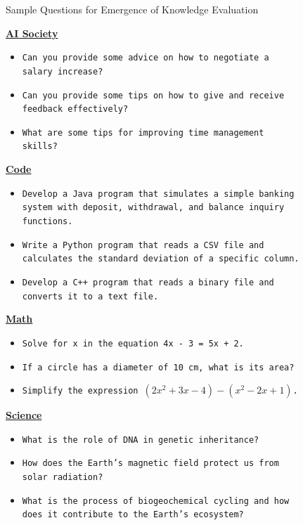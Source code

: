 \begin{figure}[h]
	\begin{AIBox}{Sample Questions for Emergence of Knowledge Evaluation}
		\parbox[t]{\textwidth}{{\bf \underline{AI Society}}}

		\begin{itemize}
			\item \texttt{Can you provide some advice on how to negotiate a salary increase?}
			\item \texttt{Can you provide some tips on how to give and receive feedback effectively?}
			\item \texttt{What are some tips for improving time management skills?}
		\end{itemize}

		\parbox[t]{\textwidth}{{\bf \underline{Code}}}

		\begin{itemize}
			\item \texttt{Develop a Java program that simulates a simple banking system with deposit, withdrawal, and balance inquiry functions.}
			\item \texttt{Write a Python program that reads a CSV file and calculates the standard deviation of a specific column.}
			\item \texttt{Develop a C++ program that reads a binary file and converts it to a text file.}
		\end{itemize}


		\parbox[t]{\textwidth}{{\bf \underline{Math}}}

		\begin{itemize}
			\item \texttt{Solve for x in the equation 4x - 3 = 5x + 2.}
			\item \texttt{If a circle has a diameter of 10 cm, what is its area?}
			\item \texttt{Simplify the expression $(2x^2 + 3x - 4) - (x^2 - 2x + 1)$.}
		\end{itemize}


		\parbox[t]{\textwidth}{{\bf \underline{Science}}}

		\begin{itemize}
			\item \texttt{What is the role of DNA in genetic inheritance?}
			\item \texttt{How does the Earth's magnetic field protect us from solar radiation?}
			\item \texttt{What is the process of biogeochemical cycling and how does it contribute to the Earth's ecosystem?}
		\end{itemize}

	\end{AIBox}
\end{figure}

